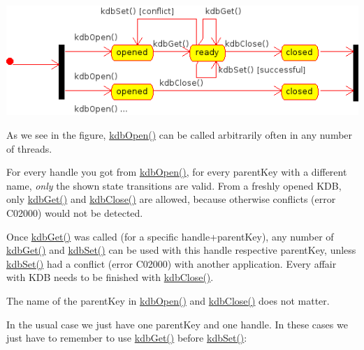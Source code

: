 \begin{DoxyImage}
\includegraphics[width=\textwidth,height=\textheight/2,keepaspectratio=true]{state.png}
\end{DoxyImage}
 As we see in the figure, \hyperlink{group__kdb_ga844e1299a84c3fbf1d3a905c5c893ba5}{kdb\+Open()} can be called arbitrarily often in any number of threads.

For every handle you got from \hyperlink{group__kdb_ga844e1299a84c3fbf1d3a905c5c893ba5}{kdb\+Open()}, for every parent\+Key with a different name, {\itshape only} the shown state transitions are valid. From a freshly opened K\+DB, only \hyperlink{group__kdb_ga28e385fd9cb7ccfe0b2f1ed2f62453a1}{kdb\+Get()} and \hyperlink{group__kdb_gadb54dc9fda17ee07deb9444df745c96f}{kdb\+Close()} are allowed, because otherwise conflicts (error C02000) would not be detected.

Once \hyperlink{group__kdb_ga28e385fd9cb7ccfe0b2f1ed2f62453a1}{kdb\+Get()} was called (for a specific handle+parent\+Key), any number of \hyperlink{group__kdb_ga28e385fd9cb7ccfe0b2f1ed2f62453a1}{kdb\+Get()} and \hyperlink{group__kdb_ga11436b058408f83d303ca5e996832bcf}{kdb\+Set()} can be used with this handle respective parent\+Key, unless \hyperlink{group__kdb_ga11436b058408f83d303ca5e996832bcf}{kdb\+Set()} had a conflict (error C02000) with another application. Every affair with K\+DB needs to be finished with \hyperlink{group__kdb_gadb54dc9fda17ee07deb9444df745c96f}{kdb\+Close()}.

The name of the parent\+Key in \hyperlink{group__kdb_ga844e1299a84c3fbf1d3a905c5c893ba5}{kdb\+Open()} and \hyperlink{group__kdb_gadb54dc9fda17ee07deb9444df745c96f}{kdb\+Close()} does not matter.

In the usual case we just have one parent\+Key and one handle. In these cases we just have to remember to use \hyperlink{group__kdb_ga28e385fd9cb7ccfe0b2f1ed2f62453a1}{kdb\+Get()} before \hyperlink{group__kdb_ga11436b058408f83d303ca5e996832bcf}{kdb\+Set()}\+:


